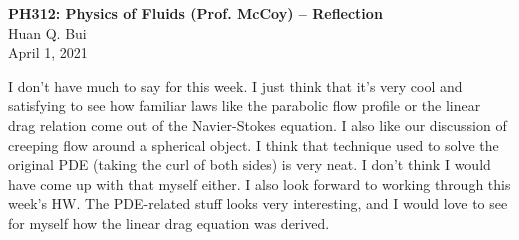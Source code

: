 \documentclass[11pt]{article}
\begin{document}
\begin{center}
{\large \bf PH312: Physics of Fluids (Prof. McCoy) -- Reflection}\\
{ Huan Q. Bui}\\
April 1, 2021
\end{center}




I don't have much to say for this week. I just think that it's very cool and satisfying to see how familiar laws like the parabolic flow profile or the linear drag relation come out of the Navier-Stokes equation. I also like our discussion of creeping flow around a spherical object. I think that technique used to solve the original PDE (taking the curl of both sides) is very neat. I don't think I would have come up with that myself either. I also look forward to working through this week's HW. The PDE-related stuff looks very interesting, and I would love to see for myself how the linear drag equation was derived.  



  
\end{document}
